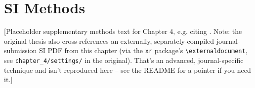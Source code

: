 \section{SI Methods}
[Placeholder supplementary methods text for Chapter 4, e.g. citing \cite{Placeholder2022Preprint}. Note: the original
thesis also cross-references an externally, separately-compiled
journal-submission SI PDF from this chapter (via the \texttt{xr} package's
\texttt{\textbackslash externaldocument}, see \texttt{chapter\_4/settings/}
in the original). That's an advanced, journal-specific technique and isn't
reproduced here -- see the README for a pointer if you need it.]
